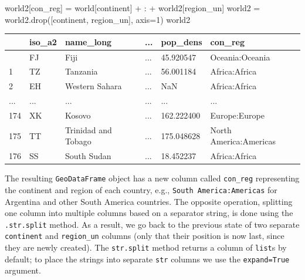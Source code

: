 \documentclass[
  letterpaper,
]{krantz}
\newenvironment{Shaded}{\begin{snugshade}}{\end{snugshade}}
\newcommand{\DecValTok}[1]{\textcolor[rgb]{0.68,0.00,0.00}{#1}}
\newcommand{\NormalTok}[1]{\textcolor[rgb]{0.00,0.23,0.31}{#1}}
\newcommand{\OperatorTok}[1]{\textcolor[rgb]{0.37,0.37,0.37}{#1}}
\newcommand{\StringTok}[1]{\textcolor[rgb]{0.13,0.47,0.30}{#1}}
\begin{document}
\begin{Shaded}
\begin{Highlighting}[]
\NormalTok{world2[}\StringTok{\textquotesingle{}con\_reg\textquotesingle{}}\NormalTok{] }\OperatorTok{=}\NormalTok{ world[}\StringTok{\textquotesingle{}continent\textquotesingle{}}\NormalTok{] }\OperatorTok{+} \StringTok{\textquotesingle{}:\textquotesingle{}} \OperatorTok{+}\NormalTok{ world2[}\StringTok{\textquotesingle{}region\_un\textquotesingle{}}\NormalTok{]}
\NormalTok{world2 }\OperatorTok{=}\NormalTok{ world2.drop([}\StringTok{\textquotesingle{}continent\textquotesingle{}}\NormalTok{, }\StringTok{\textquotesingle{}region\_un\textquotesingle{}}\NormalTok{], axis}\OperatorTok{=}\DecValTok{1}\NormalTok{)}
\NormalTok{world2}
\end{Highlighting}
\end{Shaded}

\begin{longtable}[]{@{}llllll@{}}
\toprule\noalign{}
& iso\_a2 & name\_long & ... & pop\_dens & con\_reg \\
\midrule\noalign{}
\endhead
\bottomrule\noalign{}
\endlastfoot
0 & FJ & Fiji & ... & 45.920547 & Oceania:Oceania \\
1 & TZ & Tanzania & ... & 56.001184 & Africa:Africa \\
2 & EH & Western Sahara & ... & NaN & Africa:Africa \\
... & ... & ... & ... & ... & ... \\
174 & XK & Kosovo & ... & 162.222400 & Europe:Europe \\
175 & TT & Trinidad and Tobago & ... & 175.048628 & North
America:Americas \\
176 & SS & South Sudan & ... & 18.452237 & Africa:Africa \\
\end{longtable}

The resulting \texttt{GeoDataFrame} object has a new column called
\texttt{con\_reg} representing the continent and region of each country,
e.g.,
\texttt{\textquotesingle{}South\ America:Americas\textquotesingle{}} for
Argentina and other South America countries. The opposite operation,
splitting one column into multiple columns based on a separator string,
is done using the \texttt{.str.split} method. As a result, we go back to
the previous state of two separate \texttt{continent} and
\texttt{region\_un} columns (only that their position is now last, since
they are newly created). The \texttt{str.split} method returns a column
of \texttt{list}s by default; to place the strings into separate
\texttt{str} columns we use the \texttt{expand=True} argument.
\end{document}
